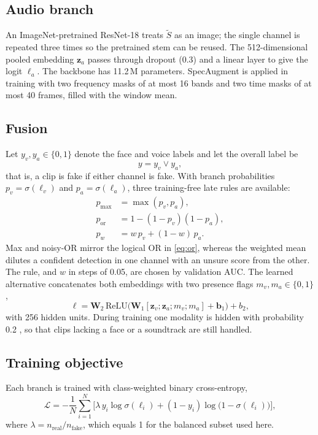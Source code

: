 \documentclass[conference]{IEEEtran}
\begin{document}
\subsection{Audio branch}
An ImageNet-pretrained ResNet-18 \cite{he2016resnet} treats $\tilde S$ as an image; the single channel is repeated three times so the pretrained stem can be reused. The 512-dimensional pooled embedding $\mathbf z_a$ passes through dropout (0.3) and a linear layer to give the logit $\ell_a$. The backbone has 11.2\,M parameters. SpecAugment \cite{park2019specaugment} is applied in training with two frequency masks of at most 16 bands and two time masks of at most 40 frames, filled with the window mean.

\subsection{Fusion}
Let $y_v,y_a\in\{0,1\}$ denote the face and voice labels and let the overall label be
\begin{equation}
y=y_v\lor y_a ,
\label{eq:or}
\end{equation}
that is, a clip is fake if either channel is fake. With branch probabilities $p_v=\sigma(\ell_v)$ and $p_a=\sigma(\ell_a)$, three training-free late rules are available:
\begin{align}
p_{\max}&=\max(p_v,p_a),\\
p_{\mathrm{or}}&=1-(1-p_v)(1-p_a),\\
p_{w}&=w\,p_v+(1-w)\,p_a .
\end{align}
Max and noisy-OR mirror the logical OR in \eqref{eq:or}, whereas the weighted mean dilutes a confident detection in one channel with an unsure score from the other. The rule, and $w$ in steps of 0.05, are chosen by validation AUC. The learned alternative concatenates both embeddings with two presence flags $m_v,m_a\in\{0,1\}$,
\begin{equation}
\ell=\mathbf W_2\,\mathrm{ReLU}\!\big(\mathbf W_1[\mathbf z_v;\mathbf z_a;m_v;m_a]+\mathbf b_1\big)+b_2 ,
\end{equation}
with 256 hidden units. During training one modality is hidden with probability 0.2 \cite{neverova2016moddrop}, so that clips lacking a face or a soundtrack are still handled.

\subsection{Training objective}
Each branch is trained with class-weighted binary cross-entropy,
\begin{equation}
\mathcal L=-\frac1N\sum_{i=1}^{N}\Big[\lambda\,y_i\log\sigma(\ell_i)+(1-y_i)\log\big(1-\sigma(\ell_i)\big)\Big],
\end{equation}
where $\lambda=n_{\text{real}}/n_{\text{fake}}$, which equals 1 for the balanced subset used here.
\end{document}
